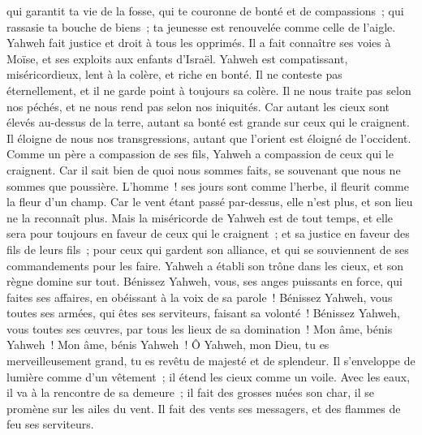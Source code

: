 \begin{multicols}{2}
qui garantit ta vie de la fosse, qui te couronne de bonté et de compassions~;
qui rassasie ta bouche de biens~; ta jeunesse est renouvelée comme celle de l'aigle.
Yahweh fait justice et droit à tous les opprimés.
Il a fait connaître ses voies à Moïse, et ses exploits aux enfants d'Israël.
Yahweh est compatissant, miséricordieux, lent à la colère, et riche en bonté.
Il ne conteste pas éternellement, et il ne garde point à toujours sa colère.
Il ne nous traite pas selon nos péchés, et ne nous rend pas selon nos iniquités.
Car autant les cieux sont élevés au-dessus de la terre, autant sa bonté est grande sur ceux qui le craignent.
Il éloigne de nous nos transgressions, autant que l'orient est éloigné de l'occident.
Comme un père a compassion de ses fils, Yahweh a compassion de ceux qui le craignent.
Car il sait bien de quoi nous sommes faits, se souvenant que nous ne sommes que poussière.
L'homme~! ses jours sont comme l'herbe, il fleurit comme la fleur d'un champ.
Car le vent étant passé par-dessus, elle n'est plus, et son lieu ne la reconnaît plus.
Mais la miséricorde de Yahweh est de tout temps, et elle sera pour toujours en faveur de ceux qui le craignent~; et sa justice en faveur des fils de leurs fils~;
pour ceux qui gardent son alliance, et qui se souviennent de ses commandements pour les faire.
Yahweh a établi son trône dans les cieux, et son règne domine sur tout.
Bénissez Yahweh, vous, ses anges puissants en force, qui faites ses affaires, en obéissant à la voix de sa parole~!
Bénissez Yahweh, vous toutes ses armées, qui êtes ses serviteurs, faisant sa volonté~!
Bénissez Yahweh, vous toutes ses œuvres, par tous les lieux de sa domination~! Mon âme, bénis Yahweh~!
\VerseOne{}Mon âme, bénis Yahweh~! Ô Yahweh, mon Dieu, tu es merveilleusement grand, tu es revêtu de majesté et de splendeur.
Il s'enveloppe de lumière comme d'un vêtement~; il étend les cieux comme un voile.
Avec les eaux, il va à la rencontre de sa demeure~; il fait des grosses nuées son char, il se promène sur les ailes du vent.
Il fait des vents ses messagers, et des flammes de feu ses serviteurs.

\end{multicols}

